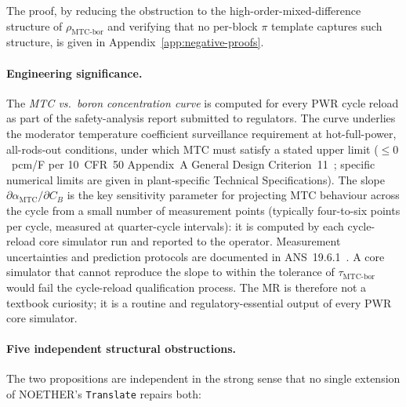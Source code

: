 \documentclass[acmsmall, screen]{acmart}
\begin{document}
The proof, by reducing the obstruction to the high-order-mixed-difference structure of $\rho_{\mathrm{MTC\text{-}bor}}$ and verifying that no per-block $\pi$ template captures such structure, is given in Appendix~\ref{app:negative-proofs}.

\paragraph{Engineering significance.}
The \emph{MTC vs.\ boron concentration curve} is computed for every PWR cycle reload as part of the safety-analysis report submitted to regulators. The curve underlies the moderator temperature coefficient surveillance requirement at hot-full-power, all-rods-out conditions, under which MTC must satisfy a stated upper limit ($\le 0$~pcm/\textdegree{}F per 10~CFR~50 Appendix~A General Design Criterion~11~\cite{NRC10CFR50AppA}; specific numerical limits are given in plant-specific Technical Specifications). The slope $\partial \alpha_{\mathrm{MTC}}/\partial C_{B}$ is the key sensitivity parameter for projecting MTC behaviour across the cycle from a small number of measurement points (typically four-to-six points per cycle, measured at quarter-cycle intervals): it is computed by each cycle-reload core simulator run and reported to the operator. Measurement uncertainties and prediction protocols are documented in ANS~19.6.1~\cite{ANS196_1}. A core simulator that cannot reproduce the slope to within the tolerance of $\tau_{\mathrm{MTC\text{-}bor}}$ would fail the cycle-reload qualification process. The MR is therefore not a textbook curiosity; it is a routine and regulatory-essential output of every PWR core simulator.

\paragraph{Five independent structural obstructions.}
\label{subsubsec:five-obstructions}

The two propositions are independent in the strong sense that no single extension of NOETHER's \texttt{Translate} repairs both:
\end{document}

